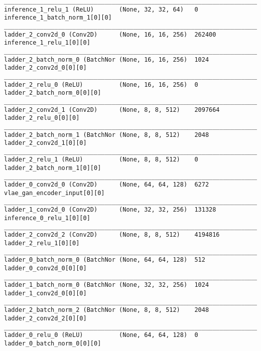 \begin{lstlisting}[caption={CelebA-VLAE-GAN Encoder},captionpos=b,basicstyle=\tiny, label={lst:mnist-vlae-gan-encoder}]
__________________________________________________________________________________________________
inference_1_relu_1 (ReLU)       (None, 32, 32, 64)   0           inference_1_batch_norm_1[0][0]
__________________________________________________________________________________________________
ladder_2_conv2d_0 (Conv2D)      (None, 16, 16, 256)  262400      inference_1_relu_1[0][0]
__________________________________________________________________________________________________
ladder_2_batch_norm_0 (BatchNor (None, 16, 16, 256)  1024        ladder_2_conv2d_0[0][0]
__________________________________________________________________________________________________
ladder_2_relu_0 (ReLU)          (None, 16, 16, 256)  0           ladder_2_batch_norm_0[0][0]
__________________________________________________________________________________________________
ladder_2_conv2d_1 (Conv2D)      (None, 8, 8, 512)    2097664     ladder_2_relu_0[0][0]
__________________________________________________________________________________________________
ladder_2_batch_norm_1 (BatchNor (None, 8, 8, 512)    2048        ladder_2_conv2d_1[0][0]
__________________________________________________________________________________________________
ladder_2_relu_1 (ReLU)          (None, 8, 8, 512)    0           ladder_2_batch_norm_1[0][0]
__________________________________________________________________________________________________
ladder_0_conv2d_0 (Conv2D)      (None, 64, 64, 128)  6272        vlae_gan_encoder_input[0][0]
__________________________________________________________________________________________________
ladder_1_conv2d_0 (Conv2D)      (None, 32, 32, 256)  131328      inference_0_relu_1[0][0]
__________________________________________________________________________________________________
ladder_2_conv2d_2 (Conv2D)      (None, 8, 8, 512)    4194816     ladder_2_relu_1[0][0]
__________________________________________________________________________________________________
ladder_0_batch_norm_0 (BatchNor (None, 64, 64, 128)  512         ladder_0_conv2d_0[0][0]
__________________________________________________________________________________________________
ladder_1_batch_norm_0 (BatchNor (None, 32, 32, 256)  1024        ladder_1_conv2d_0[0][0]
__________________________________________________________________________________________________
ladder_2_batch_norm_2 (BatchNor (None, 8, 8, 512)    2048        ladder_2_conv2d_2[0][0]
__________________________________________________________________________________________________
ladder_0_relu_0 (ReLU)          (None, 64, 64, 128)  0           ladder_0_batch_norm_0[0][0]

\end{lstlisting}
